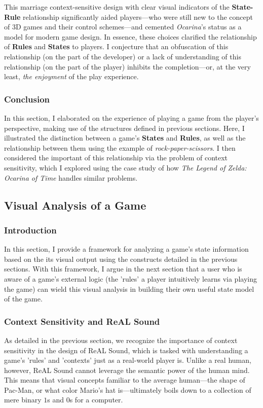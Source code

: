 \documentclass{report}
\newcommand{\rs}{ReAL Sound\xspace}
\newcommand{\state}[1]{\textbf{#1}}
\begin{document}
This marriage context-sensitive design with clear visual indicators of the \state{State-Rule} relationship significantly aided players---who were still new to the concept of 3D games and their control schemes---and cemented \emph{Ocarina}'s status as a model for modern game design. In essence, these choices clarified the relationship of \state{Rules} and \state{States} to players. I conjecture that an obfuscation of this relationship (on the part of the developer) or a lack of understanding of this relationship (on the part of the player) inhibits the completion---or, at the very least, \emph{the enjoyment} of the play experience. 

\subsubsection{Conclusion}
In this section, I elaborated on the experience of playing a game from the player's perspective, making use of the structures defined in previous sections. Here, I illustrated the distinction between a game's \state{States} and \state{Rules}, as well as the relationship between them using the example of \emph{rock-paper-scissors}. I then considered the important of this relationship via the problem of context sensitivity, which I explored using the case study of how \emph{The Legend of Zelda: Ocarina of Time} handles similar problems. 


\subsection{Visual Analysis of a Game}

\subsubsection{Introduction}
In this section, I provide a framework for analyzing a game's state information based on the its visual output using the constructs detailed in the previous sections. With this framework, I argue in the next section that a user who is aware of a game's external logic (the 'rules' a player intuitively learns via playing the game) can wield this visual analysis in building their own useful state model of the game.    

\subsubsection{Context Sensitivity and \rs}
As detailed in the previous section, we recognize the importance of context sensitivity in the design of \rs, which is tasked with understanding a game's 'rules' and 'contexts' just as a real-world player is. Unlike a real human, however, \rs cannot leverage the semantic power of the human mind. This means that visual concepts familiar to the average human---the shape of Pac-Man, or what color Mario's hat is---ultimately boils down to a collection of mere binary $1$s and $0$s for a computer. 
\end{document}
